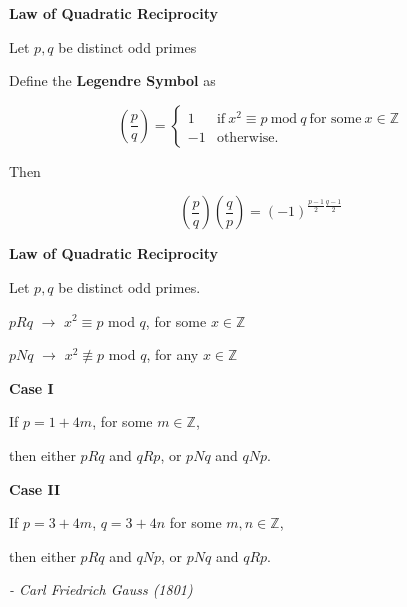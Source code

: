 \documentclass[17pt]{memoir}
\begin{document}
\begin{center}
  \textbf{Law of Quadratic Reciprocity}
\end{center}

Let $p, q$ be distinct odd primes

Define the \textbf{Legendre Symbol} as

\[
\left( \frac{p}{q} \right) =
  \begin{cases}
    1 & \text{if}\ x^2 \equiv p\ \text{mod}\ q\ \text{for some}\ x \in \mathbb{Z} \\
    -1 & \text{otherwise.}
  \end{cases}
\]

Then

\[
\left( \frac{p}{q} \right) \left( \frac{q}{p} \right)
= (-1)^{\frac{p-1}{2}\frac{q-1}{2}}
\]

\newpage


\begin{center}
  \textbf{Law of Quadratic Reciprocity}
\end{center}

Let $p, q$ be distinct odd primes.

$pRq$ $\rightarrow$ $x^2 \equiv p$ mod $q$, for some $x \in \mathbb{Z}$

$pNq$ $\rightarrow$ $x^2 \not\equiv p$ mod $q$, for any $x \in \mathbb{Z}$

\medskip
\textbf{Case I}

If $p = 1 + 4m$, for some $m \in \mathbb{Z}$,

then either $pRq$ and $qRp$, or $pNq$ and $qNp$.

\medskip
\textbf{Case II}

If $p = 3 + 4m$, $q = 3 + 4n$ for some $m,n \in \mathbb{Z}$,

then either $pRq$ and $qNp$, or $pNq$ and $qRp$.

\bigskip
\begin{flushright}
  \textit{- Carl Friedrich Gauss (1801)}
\end{flushright}
\end{document}
